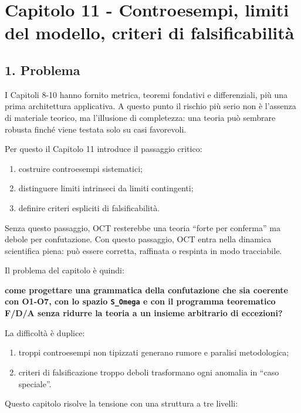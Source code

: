 \chapter{Capitolo 11 - Controesempi, limiti del modello, criteri di falsificabilità}

\section{1. Problema}

I Capitoli 8-10 hanno fornito metrica, teoremi fondativi e differenziali, più una prima architettura applicativa. A questo punto il rischio più serio non è l'assenza di materiale teorico, ma l'illusione di completezza: una teoria può sembrare robusta finché viene testata solo su casi favorevoli.

Per questo il Capitolo 11 introduce il passaggio critico:

\begin{enumerate}
\def\labelenumi{\arabic{enumi}.}
\tightlist
\item
  costruire controesempi sistematici;
\item
  distinguere limiti intrinseci da limiti contingenti;
\item
  definire criteri espliciti di falsificabilità.
\end{enumerate}

Senza questo passaggio, OCT resterebbe una teoria ``forte per conferma'' ma debole per confutazione. Con questo passaggio, OCT entra nella dinamica scientifica piena: può essere corretta, raffinata o respinta in modo tracciabile.

Il problema del capitolo è quindi:

\textbf{come progettare una grammatica della confutazione che sia coerente con O1-O7, con lo spazio \texttt{S\_Omega} e con il programma teorematico F/D/A senza ridurre la teoria a un insieme arbitrario di eccezioni?}

La difficoltà è duplice:

\begin{enumerate}
\def\labelenumi{\arabic{enumi}.}
\tightlist
\item
  troppi controesempi non tipizzati generano rumore e paralisi metodologica;
\item
  criteri di falsificazione troppo deboli trasformano ogni anomalia in ``caso speciale''.
\end{enumerate}

Questo capitolo risolve la tensione con una struttura a tre livelli:

